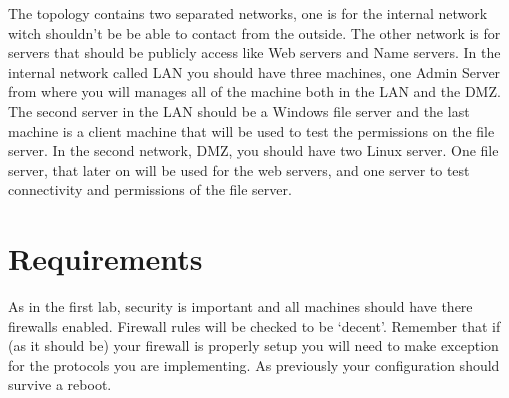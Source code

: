 \documentclass[paper=a4, fontsize=11pt]{report} %
\begin{document}
The topology contains two separated networks, one is for the internal network witch shouldn't be be able to contact from the outside. The other network is for servers that should be publicly access like Web servers and Name servers. In the internal network called LAN you should have three machines, one Admin Server from where you will manages all of the machine both in the LAN and the DMZ. The second server in the LAN should be a Windows file server and the last machine is a client machine that will be used to test the permissions on the file server. In the second network, DMZ, you should have two Linux server. One file server, that later on will be used for the web servers, and one server to test connectivity and permissions of the file server.

\pagebreak

\section{Requirements}
\label{tasks}
As in the first lab, security is important and all machines should have there firewalls enabled. Firewall rules will be checked to be ‘decent’. Remember that if (as it should be) your firewall is properly setup you will need to make exception for the protocols you are implementing.
As previously your configuration should survive a reboot.
\end{document}
